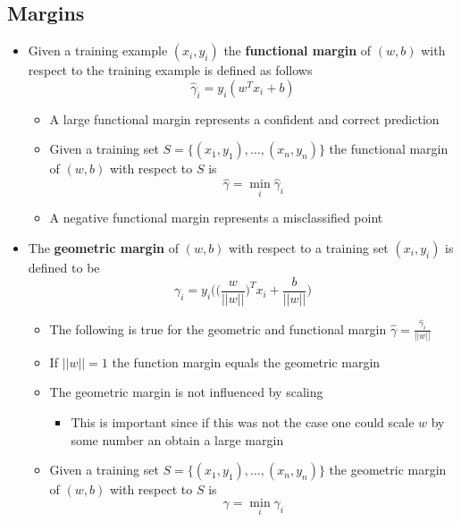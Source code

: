 \documentclass[a4, english]{article}
\begin{document}
\subsection{Margins}
\begin{itemize}
	\item Given a training example $(x_i, y_i)$ the \textbf{functional margin} of $(w,b)$ with respect to the training example is defined as follows 
\begin{equation*}
  \hat \gamma_i=y_i(w^Tx_i+b)
\end{equation*}
  \begin{itemize}
  	\item A large functional margin represents a confident and correct prediction
    \item Given a training set $S=\{(x_1,y_1), \dots, (x_n,y_n)\}$ the functional margin of $(w,b)$ with respect to $S$ is 
\begin{equation*}
  \hat \gamma = \min_i \hat \gamma_i
\end{equation*}
    \item A negative functional margin represents a misclassified point 
  \end{itemize}

  \item The \textbf{geometric margin} of $(w,b)$ with respect to a training set $(x_i, y_i)$ is defined to be
\begin{equation*}
	\gamma_i = y_i \Bigg( \bigg( \frac w{||w||} \bigg)^T x_i + \frac b{||w||}  \Bigg)
\end{equation*}
\begin{itemize}
  \item The following is true for the geometric and functional margin $\hat  \gamma = \frac{\hat \gamma_i}{||w||}$ 
	\item If $||w|| = 1$ the function margin equals the geometric margin 
  \item The geometric margin is not influenced by scaling 
  \begin{itemize}
  	\item This is important since if this was not the case one could scale $w$ by some number an obtain a large margin 
  \end{itemize}    
  \item Given a training set $S=\{(x_1,y_1), \dots, (x_n,y_n)\}$ the geometric margin of $(w,b)$ with respect to $S$ is 
\begin{equation*}
  \gamma = \min_i \gamma_i
\end{equation*}
\end{itemize}
  

\end{itemize}
\end{document}
